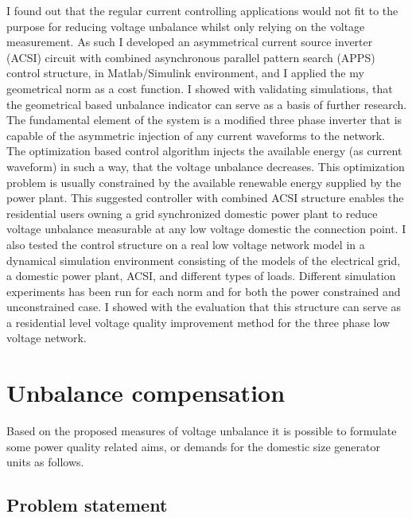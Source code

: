      I found out that the regular current controlling applications would not fit to the purpose for reducing voltage unbalance whilst only relying on the voltage measurement. As such I developed an asymmetrical current source inverter (ACSI) circuit with combined asynchronous parallel pattern search (APPS) control structure, in Matlab/Simulink environment, and I applied the my geometrical norm as a cost function. I showed with validating simulations, that the geometrical based unbalance indicator can serve as a basis of further research. 
		The fundamental element of the system is a modified three phase inverter that is capable of the asymmetric injection of any current waveforms to the network. The optimization based control algorithm injects the available energy (as current waveform) in such a way, that the voltage unbalance decreases. This optimization problem is usually constrained by the available renewable energy supplied by the power plant. This suggested controller with combined ACSI structure enables the residential users owning a grid synchronized domestic power plant to reduce voltage unbalance measurable at any low voltage domestic the connection point.
    I also tested the control structure on a real low voltage network model in a dynamical simulation environment consisting of the models of the electrical grid, a domestic power plant, ACSI, and different types of loads. Different simulation experiments has been run for each norm and for both the power constrained and unconstrained case. I showed with the evaluation that this structure can serve as a residential level voltage quality improvement method for the three phase low voltage network.

\section{Unbalance compensation}
Based on the proposed measures of voltage unbalance it is possible to formulate some power quality related aims, or demands for the domestic size generator units as follows.

    \subsection{Problem statement}

